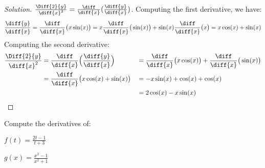 \documentclass[crop=false,class=book,oneside]{standalone}
\begin{document}
            \begin{proof}[Solution]
                $\frac{\Diff{2}{y}}{\diff{x}^{2}}%
                 =\frac{\diff}{\diff{x}}(\frac{\diff{y}}{\diff{x}})$.
                Computing the first derivative, we have:
                \begin{equation*}
                    \frac{\diff{y}}{\diff{x}}
                    =\frac{\diff}{\diff{x}}
                        \big(x\sin(x)\big)
                    =x\frac{\diff}{\diff{x}}
                        \big(\sin(x)\big)+
                        \sin(x)\frac{\diff}{\diff{x}}
                        \big(x\big)
                    =x\cos(x)+\sin(x)    
                \end{equation*}
                Computing the second derivative:
                \begin{align*}
                    \frac{\Diff{2}{y}}{\diff{x}^{2}}
                    &=\frac{\diff}{\diff{x}}
                        \Big(\frac{\diff{y}}{\diff{x}}\Big)
                    &
                    &=\frac{\diff}{\diff{x}}
                        \big(x\cos(x)\big)+
                        \frac{\diff}{\diff{x}}
                        \big(\sin(x)\big)\\
                    &=\frac{\diff}{\diff{x}}
                        \big(x\cos(x)+\sin(x)\big)
                    &
                    &=-x\sin(x)+\cos(x)+\cos(x)\\
                    &&
                    &=2\cos(x)-x\sin(x)
                \end{align*}
            \end{proof}
            \begin{problem}
                Compute the derivatives of:
                \begin{enumerate}[label=(\alph*)]
                    \begin{multicols}{2}
                        \item $f(t)=\frac{2t-1}{t+3}$
                        \item $g(x)=\frac{x^{2}-1}{x^{2}+1}$
                    \end{multicols}
                \end{enumerate}
            \end{problem}
\end{document}
